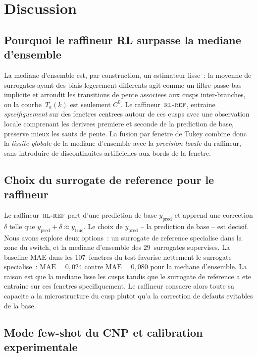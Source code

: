 \documentclass[11pt,a4paper]{article}
\newcommand{\Ta}{T_a}
\newcommand{\RLR}{\textsc{rl-ref}}           %
\begin{document}
\section{Discussion}
\label{sec:disc}

\subsection{Pourquoi le raffineur RL surpasse la mediane d'ensemble}

La mediane d'ensemble est, par construction, un estimateur lisse~:
la moyenne de surrogates ayant des biais legerement differents
agit comme un filtre passe-bas implicite et arrondit les
transitions de pente associees aux cusps inter-branches, ou la
courbe~$\Ta(k)$ est seulement $C^0$. Le raffineur~$\RLR$, entraine
\emph{specifiquement} sur des fenetres centrees autour de ces
cusps avec une observation locale comprenant les derivees premiere
et seconde de la prediction de base, preserve mieux les sauts de
pente. La fusion par fenetre de Tukey combine donc la
\emph{lissite globale} de la mediane d'ensemble avec la
\emph{precision locale} du raffineur, sans introduire de
discontinuites artificielles aux bords de la fenetre.

\subsection{Choix du surrogate de reference pour le raffineur}

Le raffineur~$\RLR$ part d'une prediction de base
$y_\text{pred}$ et apprend une correction $\delta$ telle que
$y_\text{pred}\!+\!\delta\!\approx\!y_\text{true}$. Le choix de
$y_\text{pred}$ -- la prediction de base -- est decisif. Nous avons
explore deux options~: un surrogate de reference specialise dans
la zone du switch, et la mediane d'ensemble des $29$~surrogates
supervises. La baseline MAE dans les $107$~fenetres du test
favorise nettement le surrogate specialise~:
$\mathrm{MAE}\!=\!0{,}024$ contre $\mathrm{MAE}\!=\!0{,}080$
pour la mediane d'ensemble. La raison est que la mediane lisse les
cusps tandis que le surrogate de reference a ete entraine sur ces
fenetres specifiquement. Le raffineur consacre alors toute sa
capacite a la microstructure du cusp plutot qu'a la correction
de defauts evitables de la base.

\subsection{Mode few-shot du CNP et calibration experimentale}
\end{document}
